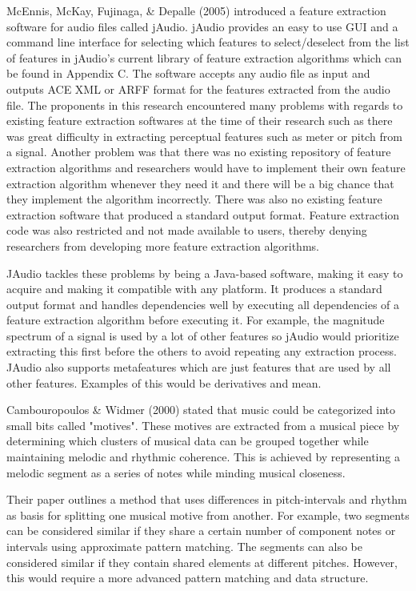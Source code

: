 	McEnnis, McKay, Fujinaga, \& Depalle (2005) introduced a feature extraction software for audio files called jAudio. jAudio provides an easy to use GUI and a command line interface for selecting which features to select/deselect from the list of features in jAudio’s current library of feature extraction algorithms which can be found in Appendix C. The software accepts any audio file as input and outputs ACE XML or ARFF format for the features extracted from the audio file. The proponents in this research encountered many problems with regards to existing feature extraction softwares at the time of their research such as there was great difficulty in extracting perceptual features such as meter or pitch from a signal. Another problem was that there was no existing repository of feature extraction algorithms and researchers would have to implement their own feature extraction algorithm whenever they need it and there will be a big chance that they implement the algorithm incorrectly. There was also no existing feature extraction software that produced a standard output format. Feature extraction code was also restricted and not made available to users, thereby denying researchers from developing more feature extraction algorithms.

	JAudio tackles these problems by being a Java-based software, making it easy to acquire and making it compatible with any platform. It produces a standard output format and handles dependencies well by executing all dependencies of a feature extraction algorithm before executing it. For example, the magnitude spectrum of a signal is used by a lot of other features so jAudio would prioritize extracting this first before the others to avoid repeating any extraction process. JAudio also supports metafeatures which are just features that are used by all other features. Examples of this would be derivatives and mean.

Cambouropoulos \& Widmer (2000) stated that music could be categorized into small bits called "motives". These motives are extracted from a musical piece by determining which clusters of musical data can be grouped together while maintaining melodic and rhythmic coherence. This is achieved by representing a melodic segment as a series of notes while minding musical closeness. 

Their paper outlines a method that uses differences in pitch-intervals and rhythm as basis for splitting one musical motive from another. For example, two segments can be considered similar if they share a certain number of component notes or intervals using approximate pattern matching. The segments can also be considered similar if they contain shared elements at different pitches. However, this would require a more advanced pattern matching and data structure.

